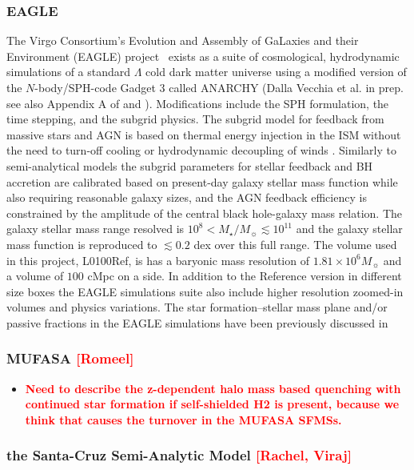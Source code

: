 \documentclass[preprint2,tighten]{aastex62}
\newcommand{\todo}[1]{{\bf \textcolor{red}{ #1}}}
\begin{document}
\subsubsection{EAGLE}
The Virgo Consortium's Evolution and Assembly of GaLaxies and their 
Environment (EAGLE) project~\citep{schaye2015, crain2015} exists as 
a suite of cosmological, hydrodynamic simulations of a standard 
$\Lambda$ cold dark matter universe using a modified version of the 
$N$-body/SPH-code Gadget 3 \citep[lastly described in][]{springel2005} called ANARCHY (Dalla Vecchia et al. in prep. see also Appendix A of \citealp{schaye2015} and \citealp{schaller2015}). Modifications include the SPH formulation, the time stepping, and the subgrid physics. The subgrid model for feedback from massive stars and AGN is based on thermal energy injection in the ISM without the need to turn-off cooling or hydrodynamic decoupling of winds \citep{dallavecchia2012}. Similarly to semi-analytical models the subgrid parameters for stellar feedback and BH accretion are calibrated based on present-day galaxy stellar mass function while also requiring reasonable galaxy sizes, and the AGN feedback efficiency is constrained by the amplitude of the central black hole-galaxy mass relation. The galaxy stellar mass range resolved is $10^{8} < M_{\star}/M_{\sun} \lesssim 10^{11}$ and the galaxy stellar mass function is reproduced to $\lesssim 0.2$ dex over this full range. The volume used in this project, L0100Ref, is has a baryonic mass resolution of $1.81\times 10^6M_{\sun}$ and a volume of $100$ cMpc on a side. In addition to the Reference version in different size boxes the EAGLE simulations suite also include higher resolution zoomed-in volumes and physics variations. The star formation--stellar mass plane and/or passive fractions in the EAGLE simulations have been previously discussed in \citet{furlong2015, trayford2015, trayford2016, trayford2017}


\subsubsection{MUFASA \todo{[Romeel]}}
\begin{itemize}
	\item \todo{Need to describe the z-dependent halo mass based quenching with continued star formation if self-shielded H2 is present, because we think that causes the turnover in the MUFASA SFMSs.}
\end{itemize}

\subsubsection{the Santa-Cruz Semi-Analytic Model \todo{[Rachel, Viraj]}}
\end{document}
